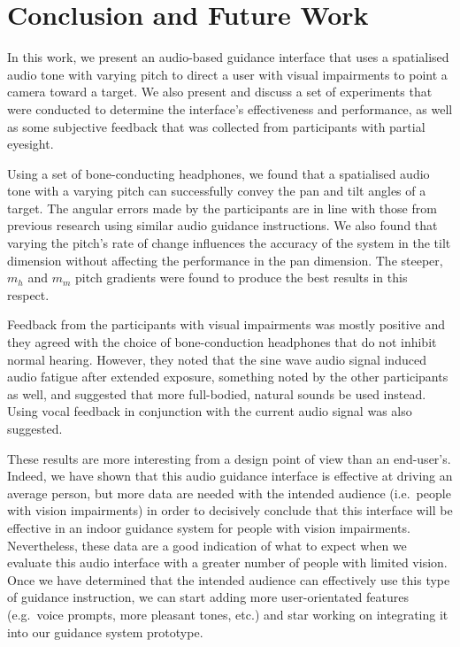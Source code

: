 \documentclass[sigconf, screen=true, anonymous=true]{acmart}
\begin{document}
\section{Conclusion and Future Work}\label{sec:conclusion}

In this work, we present an audio-based guidance interface that uses a spatialised audio tone with varying pitch to direct a user with visual impairments to point a camera toward a target. 
We also present and discuss a set of experiments that were conducted  to determine the interface's effectiveness and performance, as well as some subjective feedback that was collected from participants with partial eyesight. 

Using a set of bone-conducting headphones, we found that a spatialised audio tone with a varying pitch can successfully convey the pan and tilt angles of a target.
The angular errors made by the participants are in line with those from previous research using similar audio guidance instructions.
We also found that varying the pitch's rate of change influences the accuracy of the system in the tilt dimension without affecting the performance in the pan dimension.
The steeper, $m_h$ and $m_m$ pitch gradients were found to produce the best results in this respect.

Feedback from the participants with visual impairments was mostly positive and they agreed with the choice of bone-conduction headphones that do not inhibit normal hearing.
However, they noted that the sine wave audio signal induced audio fatigue after extended exposure, something noted by the other participants as well, and suggested that more full-bodied, natural sounds be used instead.
Using vocal feedback in conjunction with the current audio signal was also suggested. 

These results are more interesting from a design point of view than an end-user's. 
Indeed, we have shown that this audio guidance interface is effective at driving an average person, but more data are needed with the intended audience (i.e.\ people with vision impairments) in order to decisively conclude that this interface will be effective in an indoor guidance system for people with vision impairments. 
Nevertheless, these data are a good indication of what to expect when we evaluate this audio interface with a greater number of people with limited vision.
Once we have determined that the intended audience can effectively use this type of guidance instruction, we can start adding more user-orientated features (e.g.\ voice prompts, more pleasant tones, etc.) and star working on integrating it into our guidance system prototype. 
\end{document}
